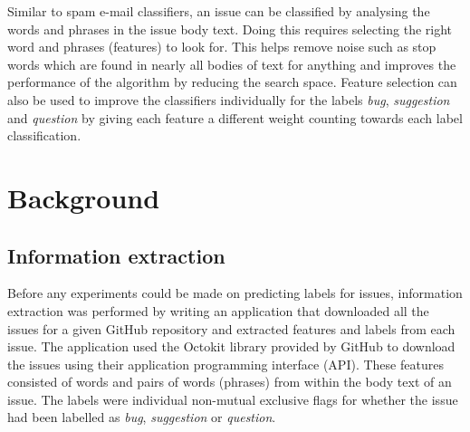 Similar to spam e-mail classifiers, an issue can be classified by analysing the words and phrases in the issue body text. Doing
this requires selecting the right word and phrases (features) to look for. This helps remove noise such as stop words which are
found in nearly all bodies of text for anything and improves the performance of the algorithm by reducing the search space.
Feature selection can also be used to improve the classifiers individually for the labels \textit{bug}, \textit{suggestion} and
\textit{question} by giving each feature a different weight counting towards each label classification.

\section{Background}
\subsection{Information extraction}
Before any experiments could be made on predicting labels for issues, information extraction was performed by writing an
application that downloaded all the issues for a given GitHub repository and extracted features and labels from each issue. The
application used the Octokit \cite{octokit} library provided by GitHub to download the issues using their application
programming interface (API). These features consisted of words and pairs of words (phrases) from within the body text of an
issue. The labels were individual non-mutual exclusive flags for whether the issue had been labelled as \textit{bug},
\textit{suggestion} or \textit{question}.

